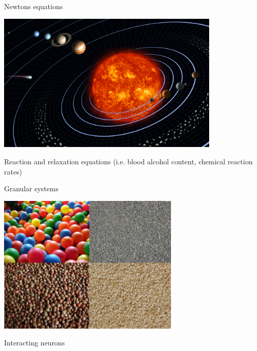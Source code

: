 \begin{frame}
 

\vspace{2ex}

\begin{minipage}{0.48\textwidth}
 \begin{center}
  Newtons equations

  \includegraphics[draft=false,width=0.8\textwidth]{solar_system.jpg}
 \end{center}
\end{minipage}
\begin{minipage}{0.48\textwidth}
 \begin{center}
  Reaction and relaxation equations (i.e. blood alcohol content, chemical reaction rates)
 \end{center}
\end{minipage}
\vspace{2ex}

\begin{minipage}{0.48\textwidth}
 \begin{center}
  Granular systems

  \includegraphics[draft=false,width=0.65\textwidth]{granular_system.png}
 \end{center}
\end{minipage}
\begin{minipage}{0.48\textwidth}
 \begin{center}
  Interacting neurons


\end{center}
\end{minipage}
\end{frame}
